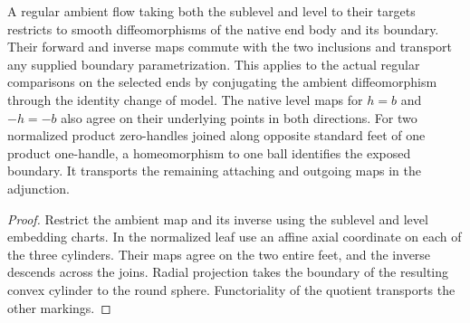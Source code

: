\begin{proposition}
\label{prop:ed03-end-markings}
\leanok
A regular ambient flow taking both the sublevel and level to their
targets restricts to smooth diffeomorphisms of the native end body and
its boundary. Their forward and inverse maps commute with the two
inclusions and transport any supplied boundary parametrization.
This applies to the actual regular comparisons on the selected ends by
conjugating the ambient diffeomorphism through the identity change of model.
The native level maps for $h=b$ and $-h=-b$ also agree on their
underlying points in both directions. For two normalized product zero-handles joined along opposite standard feet
of one product one-handle, a homeomorphism to one ball identifies the
exposed boundary. It transports the remaining attaching and outgoing maps in
the adjunction.
\end{proposition}
\begin{proof}
\leanok
Restrict the ambient map and its inverse using the sublevel and level
embedding charts. In the normalized leaf use an affine axial coordinate on
each of the three cylinders. Their maps agree on the two entire feet, and
the inverse descends across the joins. Radial projection takes the boundary of
the resulting convex cylinder to the round sphere. Functoriality of the
quotient transports the other markings.
\end{proof}

